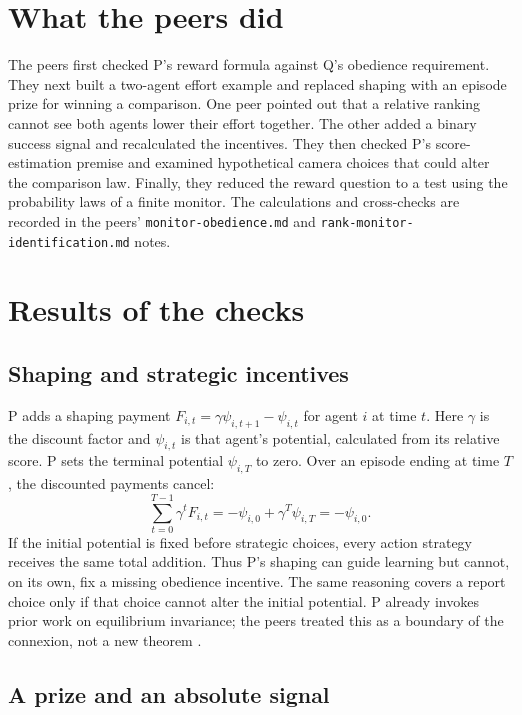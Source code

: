 \documentclass{article}
\begin{document}
\section{What the peers did}

The peers first checked P's reward formula against Q's obedience requirement. They next built a two-agent effort
example and replaced shaping with an episode prize for winning a comparison. One peer pointed out that a relative
ranking cannot see both agents lower their effort together. The other added a binary success signal and recalculated
the incentives. They then checked P's score-estimation premise and examined hypothetical camera choices that could
alter the comparison law. Finally, they reduced the reward question to a test using the probability laws of a finite
monitor. The calculations and cross-checks are recorded in the peers' \texttt{monitor-obedience.md} and
\texttt{rank-monitor-identification.md} notes.

\section{Results of the checks}

\subsection{Shaping and strategic incentives}

P adds a shaping payment \(F_{i,t}=\gamma\psi_{i,t+1}-\psi_{i,t}\) for agent \(i\) at time \(t\). Here \(\gamma\) is
the discount factor and \(\psi_{i,t}\) is that agent's potential, calculated from its relative score. P sets the
terminal potential \(\psi_{i,T}\) to zero. Over an episode ending at time \(T\), the discounted payments cancel:
\[
\sum_{t=0}^{T-1}\gamma^t F_{i,t}
=-\psi_{i,0}+\gamma^T\psi_{i,T}
=-\psi_{i,0}.
\]
If the initial potential is fixed before strategic choices, every action strategy receives the same total addition.
Thus P's shaping can guide learning but cannot, on its own, fix a missing obedience incentive. The same reasoning
covers a report choice only if that choice cannot alter the initial potential. P already invokes prior work on
equilibrium invariance; the peers treated this as a boundary of the connexion, not a new theorem
\cite{devlin2012,lu2014}.

\subsection{A prize and an absolute signal}
\end{document}
